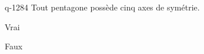\begin{truefalse}{q-1284}
Tout pentagone possède cinq axes de symétrie.
\item Vrai
\item* Faux
\end{truefalse}

